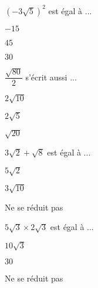 



\begin{QCM}

\begin{GroupeQCM}

\begin{exercice}$(-3\sqrt{5})^2$ est égal à ...
\begin{ChoixQCM}{3}
\item $-15$
\item $45$
\item $30$
\end{ChoixQCM}
\begin{corrige}
\end{corrige}
\end{exercice}

\begin{exercice}$\dfrac{\sqrt{80}}{2}$ s'écrit aussi ...
\begin{ChoixQCM}{3}
\item $2\sqrt{10}$
\item $2\sqrt{5}$
\item $\sqrt{20}$
\end{ChoixQCM}
\begin{corrige}
\end{corrige}
\end{exercice}

\begin{exercice}$3\sqrt{2}+\sqrt{8}$ est égal à ...
\begin{ChoixQCM}{3}
\item $5\sqrt{2}$
\item $3\sqrt{10}$
\item Ne se réduit pas
\end{ChoixQCM}
\begin{corrige}
\end{corrige}
\end{exercice}

\begin{exercice}$5\sqrt{3} \times 2\sqrt{3}$ est égal à ...
\begin{ChoixQCM}{3}
\item $10\sqrt{3}$
\item $30$
\item Ne se réduit pas
\end{ChoixQCM}
\begin{corrige}
\end{corrige}
\end{exercice}

\end{GroupeQCM}
\end{QCM}

  
